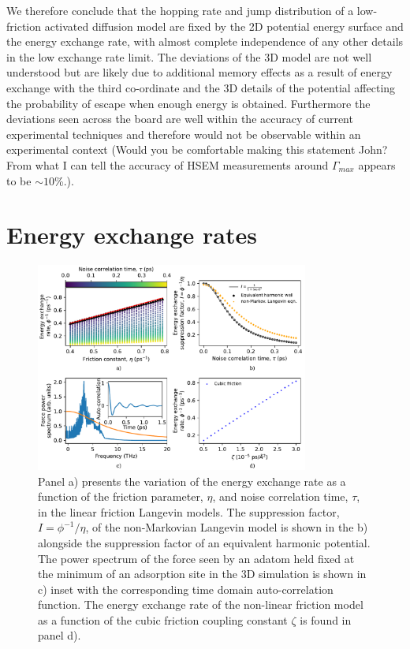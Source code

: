 \documentclass[7pt]{article}
\begin{document}
We therefore conclude that the hopping rate and jump distribution of a low-friction activated diffusion model are fixed by the 2D potential energy surface and the energy exchange rate, with almost complete independence of any other details in the low exchange rate limit. The deviations of the 3D model are not well understood but are likely due to additional memory effects as a result of energy exchange with the third co-ordinate and the 3D details of the potential affecting the probability of escape when enough energy is obtained. Furthermore the deviations seen across the board are well within the accuracy of current experimental techniques and therefore would not be observable within an experimental context (Would you be comfortable making this statement John? From what I can tell the accuracy of HSEM measurements around $\Gamma_{max}$ appears to be $\sim 10$\%.).

\section*{Energy exchange rates}

\begin{figure}
	\centering
	\includegraphics[width=0.8\textwidth]{energy_exchange_rates}
	\caption{Panel a) presents the variation of the energy exchange rate as a function of the friction parameter, $\eta$, and noise correlation time, $\tau$, in the linear friction Langevin models. The suppression factor, $I=\phi^{-1}/\eta$, of the non-Markovian Langevin model is shown in the b) alongside the suppression factor of an equivalent harmonic potential. The power spectrum of the force seen by an adatom held fixed at the minimum of an adsorption site in the 3D simulation is shown in c) inset with the corresponding time domain auto-correlation function. The energy exchange rate of the non-linear friction model as a function of the cubic friction coupling constant $\zeta$ is found in panel d).} 
	\label{fig:energy_exchange_rates}
\end{figure}
\end{document}
